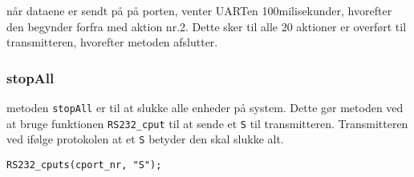 når dataene er sendt på på porten, venter UARTen 100milisekunder, hvorefter den begynder forfra med aktion nr.2. Dette sker til alle 20 aktioner er overført til transmitteren, hvorefter metoden afslutter.


\subsubsection{stopAll}
metoden \texttt{stopAll} er til at slukke alle enheder på system. Dette gør metoden ved at bruge funktionen \texttt{RS232\_cput} til at sende et \texttt{S} til transmitteren. Transmitteren ved ifølge protokolen at et \texttt{S} betyder den skal slukke alt.
\begin{lstlisting}
RS232_cputs(cport_nr, "S");
\end{lstlisting}